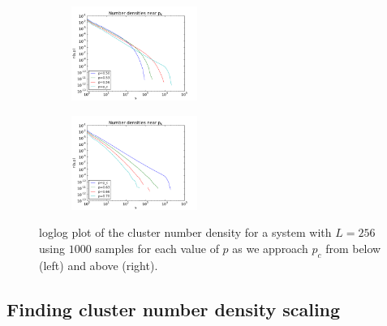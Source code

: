 \documentclass[a4paper,reprint,floatfix,amsmath,amssymb,aps,pra]{revtex4-1}
\begin{document}
\begin{figure}
  \centering
  \begin{subfigure}
  \centering
  \includegraphics[width=0.45\textwidth]{../percolation/results/1e/n-vs-s-L256-nsamples10000-frombelow.pdf}
  \end{subfigure}
  \begin{subfigure}
  \centering
  \includegraphics[width=0.45\textwidth]{../percolation/results/1e/n-vs-s-L256-nsamples10000-fromabove.pdf}
  \end{subfigure}
  \caption{loglog plot of the cluster number density for a system with $L=256$ using $1000$ samples for each value of $p$ as we approach $p_c$ from below (left) and above (right).}
  \label{fig:cluster-number-density}
\end{figure}

\subsection{Finding cluster number density scaling}
\end{document}
